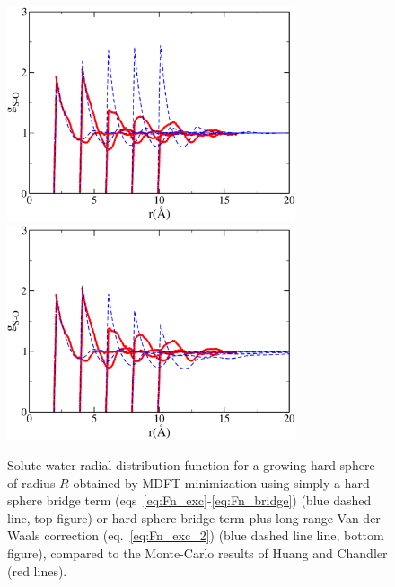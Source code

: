 \documentclass[aip,jcp,preprint]{revtex4-1}
\begin{document}
\begin{figure}
    \includegraphics[width=8.5cm]{comp_MD_MDFT_ChandlerSys_HSB_SPC.pdf}\\
    \includegraphics[width=8.5cm]{comp_MD_MDFT_ChandlerSys_VdW_a12p3m0p9_SPC.pdf}
    \caption{
        \label{fig:gr_Chandler}
        Solute-water radial distribution function for a growing hard sphere of radius $R$ obtained by MDFT minimization using simply a hard-sphere bridge term (eqs~\ref{eq:Fn_exc}-\ref{eq:Fn_bridge}) (blue dashed line, top figure) or hard-sphere bridge term plus long range Van-der-Waals correction (eq.~\ref{eq:Fn_exc_2}) (blue dashed line line, bottom figure), compared to the Monte-Carlo results of Huang and Chandler\cite{huang02} (red lines).       
        }
\end{figure}
\end{document}
